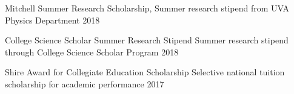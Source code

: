 \begin{cvhonors}
  \cvhonor
    {Mitchell Summer Research Scholarship,} %
    {Summer research stipend from UVA Physics Department} %
    {} %
    {2018} %
    
  \cvhonor
    { College Science Scholar Summer Research Stipend} %
    {Summer research stipend through College Science Scholar Program} %
    {} %
    {2018} %
    
  \cvhonor
    {Shire Award for Collegiate Education Scholarship} %
    {Selective national tuition scholarship for academic performance} %
    {} %
    {2017} %


    


\end{cvhonors}





